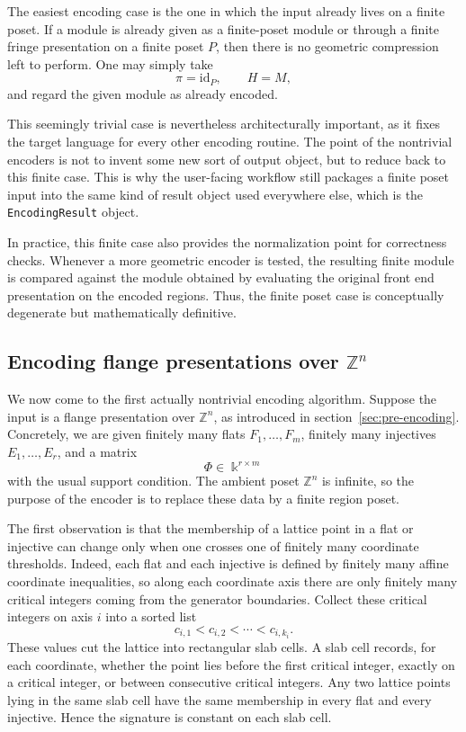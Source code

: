 \documentclass[11pt]{article}
\newcommand{\Z}{\mathbb{Z}}
\newcommand{\kk}{\Bbbk}
\theoremstyle{definition}
\theoremstyle{remark}
\begin{document}
The easiest encoding case is the one in which the input already lives on a finite poset.  If a module is already given as a finite-poset module or through a finite fringe presentation on a finite poset $P$, then there is no geometric compression left to perform.  One may simply take
\[
\pi = \mathrm{id}_P,
\qquad
H=M,
\]
and regard the given module as already encoded.

This seemingly trivial case is nevertheless architecturally important, as it fixes the target language for every other encoding routine.  The point of the nontrivial encoders is not to invent some new sort of output object, but to reduce back to this finite case.  This is why the user-facing workflow still packages a finite poset input into the same kind of result object used everywhere else, which is the \texttt{EncodingResult} object.

In practice, this finite case also provides the normalization point for correctness checks.  Whenever a more geometric encoder is tested, the resulting finite module is compared against the module obtained by evaluating the original front end presentation on the encoded regions.  Thus, the finite poset case is conceptually degenerate but mathematically definitive.

\subsection{Encoding flange presentations over $\mathbb{Z}^n$}
\label{subsec:encoding-zn}

We now come to the first actually nontrivial encoding algorithm.  Suppose the input is a flange presentation over $\Z^n$, as introduced in section~\ref{sec:pre-encoding}.  Concretely, we are given finitely many flats $F_1, \dots,F_m$, finitely many injectives $E_1, \dots,E_r$, and a matrix
\[
\Phi \in \kk^{r \times m}
\]
with the usual support condition.  The ambient poset $\Z^n$ is infinite, so the purpose of the encoder is to replace these data by a finite region poset.

The first observation is that the membership of a lattice point in a flat or injective can change only when one crosses one of finitely many coordinate thresholds.  Indeed, each flat and each injective is defined by finitely many affine coordinate inequalities, so along each coordinate axis there are only finitely many critical integers coming from the generator boundaries.  Collect these critical integers on axis $i$ into a sorted list
\[
c_{i,1}<c_{i,2}< \cdots<c_{i,k_i}.
\]
These values cut the lattice into rectangular slab cells.  A slab cell records, for each coordinate, whether the point lies before the first critical integer, exactly on a critical integer, or between consecutive critical integers.  Any two lattice points lying in the same slab cell have the same membership in every flat and every injective.  Hence the signature is constant on each slab cell.
\end{document}
